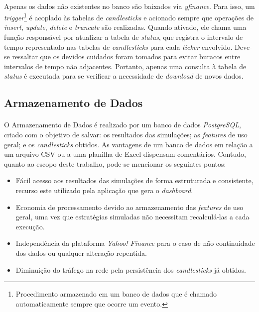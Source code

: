 \paragraph{} Apenas os dados não existentes no banco são baixados via \textit{yfinance}. Para isso, um \textit{trigger}\footnote{Procedimento armazenado em um banco de dados que é chamado automaticamente sempre que ocorre um evento.} é acoplado às tabelas de \textit{candlesticks} e acionado sempre que operações de \textit{insert}, \textit{update}, \textit{delete} e \textit{truncate} são realizadas. Quando ativado, ele chama uma função responsável por atualizar a tabela de \textit{status}, que registra o intervalo de tempo representado nas tabelas de \textit{candlesticks} para cada \textit{ticker} envolvido. Deve-se ressaltar que os devidos cuidados foram tomados para evitar buracos entre intervalos de tempo não adjacentes. Portanto, apenas uma consulta à tabela de \textit{status} é executada para se verificar a necessidade de \textit{download} de novos dados.



\subsection{Armazenamento de Dados}

\paragraph{} O Armazenamento de Dados é realizado por um banco de dados \textit{PostgreSQL}, criado com o objetivo de salvar: os resultados das simulações; as \textit{features} de uso geral; e os \textit{candlesticks} obtidos. As vantagens de um banco de dados em relação a um arquivo CSV ou a uma planilha de Excel dispensam comentários. Contudo, quanto ao escopo deste trabalho, pode-se mencionar os seguintes pontos:

\begin{itemize}
    \item Fácil acesso aos resultados das simulações de forma estruturada e consistente, recurso este utilizado pela aplicação que gera o \textit{dashboard}.
    \item Economia de processamento devido ao armazenamento das \textit{features} de uso geral, uma vez que estratégias simuladas não necessitam recalculá-las a cada execução.
    \item Independência da plataforma \textit{Yahoo! Finance} para o caso de não continuidade dos dados ou qualquer alteração repentida.
    \item Diminuição do tráfego na rede pela persistência dos \textit{candlesticks} já obtidos.
\end{itemize}

